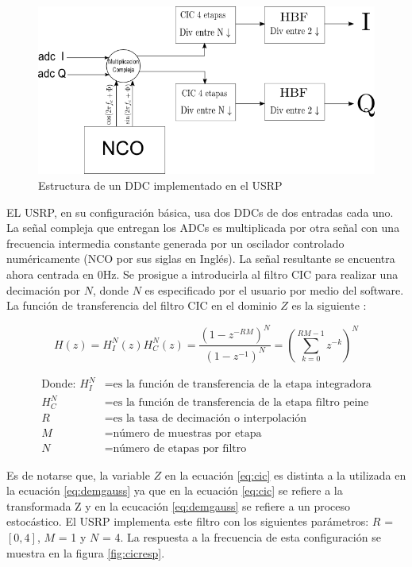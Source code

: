 \begin{figure}[htp]
\centering
	\includegraphics[width=5.5in]{figs/ddc}
	\vspace{0.3in}
	\caption{Estructura de un DDC implementado en el USRP}
	\label{fig:ddcblock}
\end{figure}

EL USRP, en su configuraci\'on b\'asica, usa dos DDCs de dos entradas cada uno. La se\~nal compleja que entregan los ADCs es
multiplicada por otra se\~nal con una frecuencia intermedia constante generada por un oscilador controlado num\'ericamente (NCO
por sus siglas en Ingl\'es). La se\~nal resultante se encuentra ahora centrada en 0Hz. Se prosigue a introducirla al filtro CIC
para realizar una decimaci\'on por $N$, donde $N$ es especificado por el usuario por medio del software. La funci\'on de
transferencia del filtro CIC en el dominio $Z$ es la siguiente \cite{cic}:

\begin{equation}\label{eq:cic}
H(z)=H_I^N(z)H_C^N(z)=\frac{(1-z^{-RM})^N}{(1-z^{-1})^N}=\left(\sum_{k=0}^{RM-1}z^{-k}\right)^N
\end{equation}

\begin{equation*}
\begin{aligned}
\text{Donde: }H_I^N&=\text{es la funci\'on de transferencia de la etapa
integradora}\\
H_C^N&=\text{es la funci\'on de transferencia de la etapa filtro peine}\\
R&=\text{es la tasa de decimaci\'on o interpolaci\'on}\\
M&=\text{n\'umero de muestras por etapa}\\
N&=\text{n\'umero de etapas por filtro}
\end{aligned}
\end{equation*}

Es de notarse que, la variable $Z$ en la ecuaci\'on \ref{eq:cic} es distinta a la utilizada en la ecuaci\'on \ref{eq:demgauss} ya
que en la ecuaci\'on \ref{eq:cic} se refiere a la transformada Z y en la ecucaci\'on \ref{eq:demgauss} se refiere a un proceso
estoc\'astico. El USRP implementa este filtro con los siguientes par\'ametros: $R$ = $[0,4]$, $M$ = 1 y $N$ = 4. La
respuesta a la frecuencia de esta configuraci\'on se muestra en la figura \ref{fig:cicresp}.

